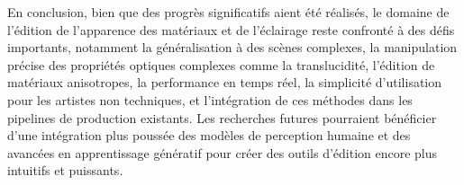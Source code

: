 \documentclass{article}
\begin{document}
En conclusion, bien que des progrès significatifs aient été réalisés, le domaine de l'édition de l'apparence des matériaux et de l'éclairage reste confronté à des défis importants, notamment la généralisation à des scènes complexes, la manipulation précise des propriétés optiques complexes comme la translucidité, l'édition de matériaux anisotropes, la performance en temps réel, la simplicité d'utilisation pour les artistes non techniques, et l'intégration de ces méthodes dans les pipelines de production existants. Les recherches futures pourraient bénéficier d'une intégration plus poussée des modèles de perception humaine et des avancées en apprentissage génératif pour créer des outils d'édition encore plus intuitifs et puissants.
\end{document}
